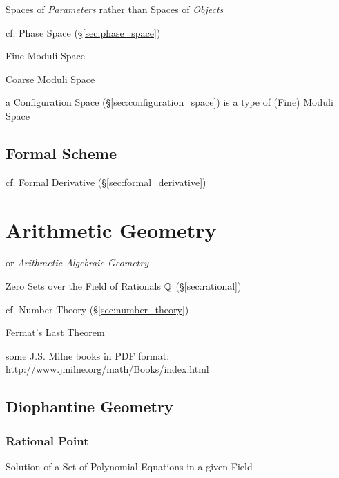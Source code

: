 Spaces of \emph{Parameters} rather than Spaces of \emph{Objects}

cf. Phase Space (\S\ref{sec:phase_space})

Fine Moduli Space

Coarse Moduli Space

a Configuration Space (\S\ref{sec:configuration_space}) is a type of (Fine)
Moduli Space



\subsection{Formal Scheme}\label{sec:formal_scheme}

cf. Formal Derivative (\S\ref{sec:formal_derivative})



\section{Arithmetic Geometry}\label{sec:arithmetic_geometry}

or \emph{Arithmetic Algebraic Geometry}

Zero Sets over the Field of Rationals $\mathbb{Q}$ (\S\ref{sec:rational})

cf. Number Theory (\S\ref{sec:number_theory})

Fermat's Last Theorem

some J.S. Milne books in PDF format:
\url{http://www.jmilne.org/math/Books/index.html}



\subsection{Diophantine Geometry}\label{sec:diophantine_geometry}

\subsubsection{Rational Point}\label{sec:rational_point}

Solution of a Set of Polynomial Equations in a given Field



